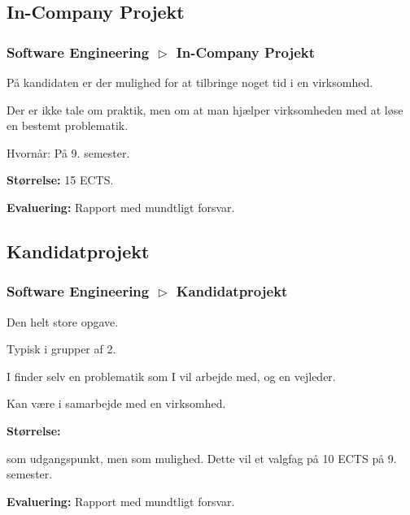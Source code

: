 \subsection{In-Company Projekt}
\begin{frame}[fragile]
  \frametitle{Software Engineering $\vartriangleright$ In-Company Projekt}
  \vspace{3mm}
  På kandidaten er der mulighed for at tilbringe noget tid i en virksomhed.
  
  \pause
  \vspace{5mm}
  Der er ikke tale om praktik, men om at man hjælper virksomheden med at løse en bestemt problematik.
  
  \pause
  \vspace{5mm}
  Hvornår: På 9. semester.
  
  \pause
  \vspace{5mm}
  \textbf{Størrelse:} 15 ECTS.
  
  \pause
  \vspace{5mm}
  \textbf{Evaluering:} Rapport med mundtligt forsvar.
\end{frame}

\subsection{Kandidatprojekt}
\begin{frame}[fragile]
  \frametitle{Software Engineering $\vartriangleright$ Kandidatprojekt}
  \vspace{3mm}
  Den helt store opgave.
  
  \pause
  \vspace{5mm}
  Typisk i grupper af 2.
  
  \pause
  \vspace{5mm}
  I finder selv en problematik som I vil arbejde med, og en vejleder.
  
  \pause
  \vspace{5mm}
  Kan være i samarbejde med en virksomhed.
  
  \pause
  \vspace{5mm}
  \textbf{Størrelse:}
  \begin{itemize}
     som udgangspunkt\pause, men
     som mulighed. Dette vil  et valgfag på 10 ECTS på 9. semester.
  \end{itemize}
  
  \pause
  \vspace{5mm}
  \textbf{Evaluering:} Rapport med mundtligt forsvar.
\end{frame}

